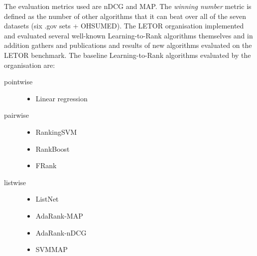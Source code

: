 The evaluation metrics used are \ac{nDCG} and \ac{MAP}. The \emph{winning number} metric is defined as the number of other algorithms that it can beat over all of the seven datasets (six .gov sets + OHSUMED). The LETOR organisation implemented and evaluated several well-known Learning-to-Rank algorithms themselves and in addition gathers and publications and results of new algorithms evaluated on the LETOR benchmark. The baseline Learning-to-Rank algorithms evaluated by the organisation are:
\begin{description}
\item[pointwise]{\leavevmode
	\begin{itemize}
	\item Linear regression
	\end{itemize}}
\item[pairwise]{\leavevmode
	\begin{itemize}
	\item RankingSVM \cite{Herbrich1999,Joachims2002}
	\item RankBoost \cite{Freund2003}
	\item FRank \cite{Tsai2007}
	\end{itemize}}
\item[listwise]{\leavevmode
	\begin{itemize}
	\item ListNet \cite{Cao2007}
	\item AdaRank-MAP \cite{Xu2007}
	\item AdaRank-nDCG \cite{Xu2007}
	\item SVMMAP \cite{Yue2007} 
	\end{itemize}}
\end{description} 
